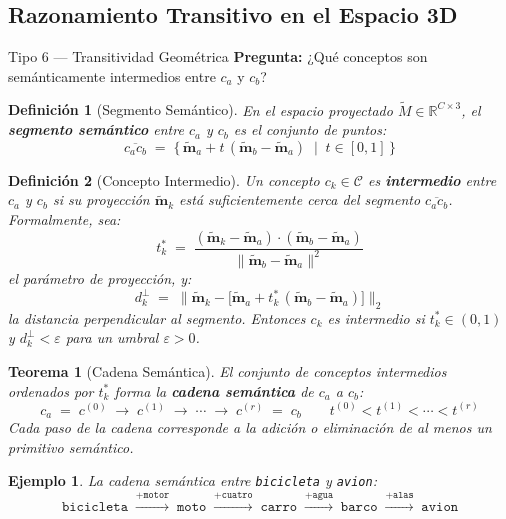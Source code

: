 \documentclass[12pt]{article}
\newtheorem{theorem}{Teorema}[section]
\newtheorem{definition}{Definición}[section]
\newtheorem{example}{Ejemplo}[section]
\begin{document}
\subsection{Razonamiento Transitivo en el Espacio 3D}

\begin{razonbox}{Tipo 6 — Transitividad Geométrica}
	\textbf{Pregunta:} ¿Qué conceptos son semánticamente intermedios entre
	$c_a$ y $c_b$?
\end{razonbox}

\begin{definition}[Segmento Semántico]
	En el espacio proyectado $\tilde{M} \in \mathbb{R}^{C \times 3}$, el
	\textbf{segmento semántico} entre $c_a$ y $c_b$ es el conjunto de puntos:
	\[
	\overline{c_a c_b} \;=\;
	\bigl\{\,\tilde{\mathbf{m}}_a + t\,
	(\tilde{\mathbf{m}}_b - \tilde{\mathbf{m}}_a)
	\;\mid\; t \in [0,1]\,\bigr\}
	\]
\end{definition}

\begin{definition}[Concepto Intermedio]
	Un concepto $c_k \in \mathcal{C}$ es \textbf{intermedio} entre $c_a$ y $c_b$ si
	su proyección $\tilde{\mathbf{m}}_k$ está suficientemente cerca del segmento
	$\overline{c_a c_b}$. Formalmente, sea:
	\[
	t_k^* \;=\; \frac{
		(\tilde{\mathbf{m}}_k - \tilde{\mathbf{m}}_a)
		\cdot
		(\tilde{\mathbf{m}}_b - \tilde{\mathbf{m}}_a)
	}{
		\|\tilde{\mathbf{m}}_b - \tilde{\mathbf{m}}_a\|^2
	}
	\]
	el parámetro de proyección, y:
	\[
	d_k^\perp \;=\;
	\bigl\|\tilde{\mathbf{m}}_k -
	\bigl[\tilde{\mathbf{m}}_a + t_k^*\,
	(\tilde{\mathbf{m}}_b - \tilde{\mathbf{m}}_a)\bigr]
	\bigr\|_2
	\]
	la distancia perpendicular al segmento. Entonces $c_k$ es intermedio si
	$t_k^* \in (0,1)$ y $d_k^\perp < \varepsilon$ para un umbral $\varepsilon > 0$.
\end{definition}

\begin{theorem}[Cadena Semántica]
	El conjunto de conceptos intermedios ordenados por $t_k^*$ forma la
	\textbf{cadena semántica} de $c_a$ a $c_b$:
	\[
	c_a \;=\; c^{(0)} \;\to\; c^{(1)} \;\to\; \cdots \;\to\; c^{(r)} \;=\; c_b
	\qquad t^{(0)} < t^{(1)} < \cdots < t^{(r)}
	\]
	Cada paso de la cadena corresponde a la adición o eliminación de al menos un
	primitivo semántico.
\end{theorem}

\begin{example}
	La cadena semántica entre \texttt{bicicleta} y \texttt{avion}:
	\[
	\texttt{bicicleta}
	\;\xrightarrow{+\texttt{motor}}\;
	\texttt{moto}
	\;\xrightarrow{+\texttt{cuatro}}\;
	\texttt{carro}
	\;\xrightarrow{+\texttt{agua}}\;
	\texttt{barco}
	\;\xrightarrow{+\texttt{alas}}\;
	\texttt{avion}
	\]
\end{example}
\end{document}
